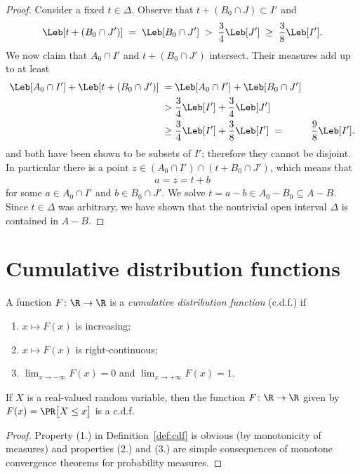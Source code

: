 \begin{proof}
  Consider a fixed $t \in \Delta$.
  Observe that $t + (B_0 \cap J) \subset I'$ and
  \begin{align*}
    \Leb[t + (B_0 \cap J')] \; = \; \Leb[B_0 \cap J']
      \; > \; \frac{3}{4} \Leb[J'] \; \ge \; \frac{3}{8} \Leb[I'] .
  \end{align*}
  We now claim that $A_0 \cap I'$ and $t + (B_0 \cap J')$ intersect.
  Their measures add up to at least
  \begin{align*}
    \Leb[A_0 \cap I'] + \Leb[t + (B_0 \cap J')]
    \; = \; & \Leb[A_0 \cap I'] + \Leb[B_0 \cap J'] \\
    \; > \; & \frac{3}{4} \Leb[I'] + \frac{3}{4} \Leb[J'] \\
    \; \ge \; & \frac{3}{4} \Leb[I'] + \frac{3}{8} \Leb[I']
    \; = \; & \frac{9}{8} \Leb[I'] .
  \end{align*}
  and both have been shown to be subsets of $I'$; therefore they
  cannot be disjoint.
  In particular there is a point $z \in (A_0 \cap I') \cap (t + B_0 \cap J')$,
  which means that
  \begin{align*}
    a = z = t + b
  \end{align*}
  for some $a \in A_0 \cap I'$ and $b \in B_0 \cap J'$. We solve
  $t = a - b \in A_0 - B_0 \subseteq A - B$. Since $t \in \Delta$
  was arbitrary, we have shown that the nontrivial open interval $\Delta$
  is contained in $A - B$.
\end{proof}


\chapter{Cumulative distribution functions}

\begin{definition}
  \label{def:cdf}
  \leanok
  A function $F \colon \R \to \R$ is a
  \emph{cumulative distribution function} (c.d.f.) if
  \begin{enumerate}
  \item[(i)] $x \mapsto F(x)$ is increasing;
  \item[(ii)] $x \mapsto F(x)$ is right-continuous;
  \item[(iii)] $\lim_{x \to -\infty} F(x) = 0$ and $\lim_{x \to +\infty} F(x) = 1$.
  \end{enumerate}
\end{definition}

\begin{lemma}
  \label{lem:cdf-of-random-var}
  \leanok
  If $X$ is a real-valued random variable, then the function
  $F \colon \R \to \R$ given by $F(x) = \PR \big[ X \le x \big]$ is a c.d.f.
\end{lemma}
\begin{proof}
  Property (1.) in Definition~\ref{def:cdf} is obvious (by monotonicity of measures)
  and properties (2.) and (3.) are simple consequences of monotone convergence
  theorems for probability measures.
\end{proof}

